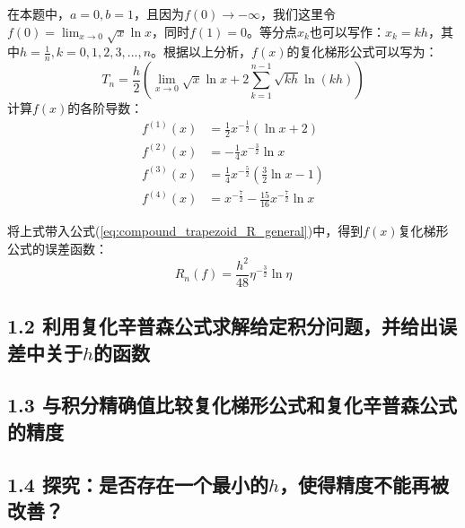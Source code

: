 在本题中，$a=0,b=1$，且因为$f(0) \rightarrow -\infty$，我们这里令$f(0) = \lim_{x \rightarrow 0} \sqrt{x} \ln x$，同时$f(1) = 0$。等分点$x_k$也可以写作：$x_k = kh$，其中$h = \frac{1}{n},k=0,1,2,3,...,n$。根据以上分析，$f(x)$的复化梯形公式可以写为：
\begin{equation}
    T_n = \frac{h}{2} \left(\lim_{x\rightarrow 0} \sqrt{x} \ln x + 2 \sum_{k=1}^{n-1} \sqrt{kh} \ln(kh)\right)
    \label{eq:compound_trapezoid_f}
\end{equation}
计算$f(x)$的各阶导数：
\begin{equation}
    \begin{aligned}
        f^{(1)}(x) & = \frac{1}{2} x^{-\frac{1}{2}} (\ln x + 2) \\
        f^{(2)}(x) & = -\frac{1}{4} x^{-\frac{3}{2}} \ln x \\
        f^{(3)}(x) & = \frac{1}{4} x^{-\frac{5}{2}} (\frac{3}{2} \ln x -1) \\
        f^{(4)}(x) & = x^{-\frac{7}{2}} - \frac{15}{16} x^{-\frac{7}{2}} \ln x
    \end{aligned}
    \label{eq:f_differential}
\end{equation}

将上式带入公式(\ref{eq:compound_trapezoid_R_general})中，得到$f(x)$复化梯形公式的误差函数：
\begin{equation}
    R_n(f) = \frac{h^2}{48} \eta^{-\frac{3}{2}} \ln \eta
    \label{eq:compound_trapezoid_R_f}
\end{equation}

\subsection*{1.2 利用复化辛普森公式求解给定积分问题，并给出误差中关于$h$的函数}

\subsection*{1.3 与积分精确值比较复化梯形公式和复化辛普森公式的精度}

\subsection*{1.4 探究：是否存在一个最小的$h$，使得精度不能再被改善？}